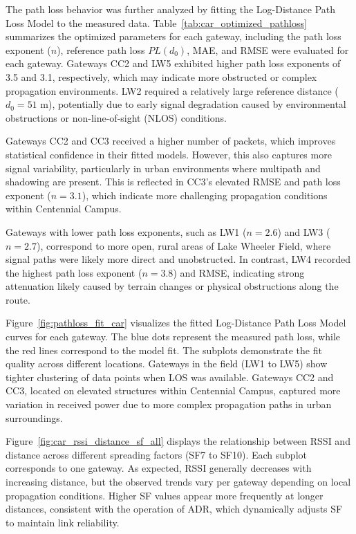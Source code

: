\documentclass[journal]{IEEEtran}
\begin{document}
The path loss behavior was further analyzed by fitting the Log-Distance Path Loss Model to the measured data. Table~\ref{tab:car_optimized_pathloss} summarizes the optimized parameters for each gateway, including the path loss exponent ($n$), reference path loss $PL(d_0)$, MAE, and RMSE were evaluated for each gateway. Gateways CC2 and LW5 exhibited higher path loss exponents of 3.5 and 3.1, respectively, which may indicate more obstructed or complex propagation environments. LW2 required a relatively large reference distance ($d_0 = 51$ m), potentially due to early signal degradation caused by environmental obstructions or non-line-of-sight (NLOS) conditions.

Gateways CC2 and CC3 received a higher number of packets, which improves statistical confidence in their fitted models. However, this also captures more signal variability, particularly in urban environments where multipath and shadowing are present. This is reflected in CC3’s elevated RMSE and path loss exponent ($n = 3.1$), which indicate more challenging propagation conditions within Centennial Campus.

Gateways with lower path loss exponents, such as LW1 ($n = 2.6$) and LW3 ($n = 2.7$), correspond to more open, rural areas of Lake Wheeler Field, where signal paths were likely more direct and unobstructed. In contrast, LW4 recorded the highest path loss exponent ($n = 3.8$) and RMSE, indicating strong attenuation likely caused by terrain changes or physical obstructions along the route.

Figure~\ref{fig:pathloss_fit_car} visualizes the fitted Log-Distance Path Loss Model curves for each gateway. The blue dots represent the measured path loss, while the red lines correspond to the model fit. The subplots demonstrate the fit quality across different locations. Gateways in the field (LW1 to LW5) show tighter clustering of data points when LOS was available. Gateways CC2 and CC3, located on elevated structures within Centennial Campus, captured more variation in received power due to more complex propagation paths in urban surroundings.

Figure~\ref{fig:car_rssi_distance_sf_all} displays the relationship between RSSI and distance across different spreading factors (SF7 to SF10). Each subplot corresponds to one gateway. As expected, RSSI generally decreases with increasing distance, but the observed trends vary per gateway depending on local propagation conditions. Higher SF values appear more frequently at longer distances, consistent with the operation of ADR, which dynamically adjusts SF to maintain link reliability.
\end{document}
